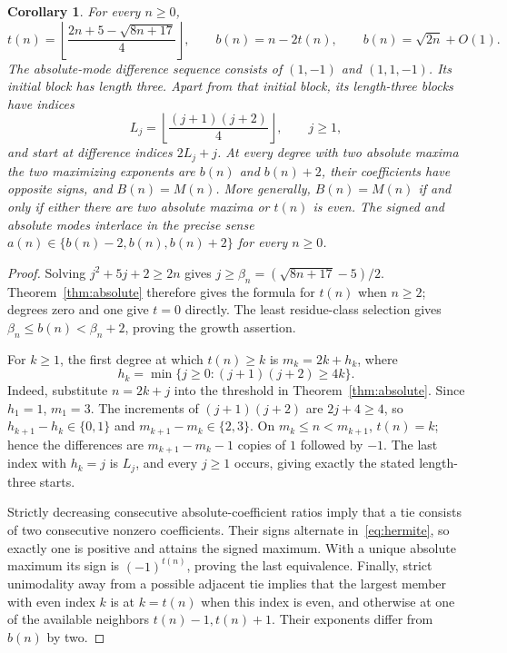 \documentclass[11pt]{article}
\newtheorem{corollary}[theorem]{Corollary}
\newcommand{\floor}[1]{\left\lfloor #1\right\rfloor}
\begin{document}
\begin{corollary}\label{cor:absolute-blocks}
For every $n\geq0$,
\[
 t(n)=\floor{\frac{2n+5-\sqrt{8n+17}}4},\qquad b(n)=n-2t(n),
 \qquad b(n)=\sqrt{2n}+O(1).
\]
The absolute-mode difference sequence consists of $(1,-1)$ and $(1,1,-1)$.
Its initial block has length three. Apart from that initial block, its
length-three blocks have indices
\[
 L_j=\floor{\frac{(j+1)(j+2)}4},\qquad j\geq1,
\]
and start at difference indices $2L_j+j$.
At every degree with two absolute maxima the two maximizing exponents
are $b(n)$ and $b(n)+2$, their coefficients have opposite signs,
and $B(n)=M(n)$.
More generally, $B(n)=M(n)$ if and only if either there are two absolute
maxima or $t(n)$ is even.
The signed and absolute modes interlace in the precise sense
$a(n)\in\{b(n)-2,b(n),b(n)+2\}$ for every $n\geq0$.
\end{corollary}

\begin{proof}
Solving $j^2+5j+2\geq2n$ gives
$j\geq\beta_n=(\sqrt{8n+17}-5)/2$. Theorem~\ref{thm:absolute}
therefore gives the formula for $t(n)$ when $n\geq2$; degrees zero and
one give $t=0$ directly. The least residue-class selection gives
$\beta_n\leq b(n)<\beta_n+2$, proving the growth assertion.

For $k\geq1$, the first degree at which $t(n)\geq k$ is
$m_k=2k+h_k$, where
\[
 h_k=\min\{j\geq0:(j+1)(j+2)\geq4k\}.
\]
Indeed, substitute $n=2k+j$ into the threshold in
Theorem~\ref{thm:absolute}. Since $h_1=1$, $m_1=3$.
The increments of $(j+1)(j+2)$ are $2j+4\geq4$, so
$h_{k+1}-h_k\in\{0,1\}$ and $m_{k+1}-m_k\in\{2,3\}$.
On $m_k\leq n<m_{k+1}$, $t(n)=k$; hence the differences are
$m_{k+1}-m_k-1$ copies of $1$ followed by $-1$.
The last index with $h_k=j$ is $L_j$, and every $j\geq1$ occurs,
giving exactly the stated length-three starts.

Strictly decreasing consecutive absolute-coefficient ratios imply that
a tie consists of two consecutive nonzero coefficients. Their signs
alternate in~\eqref{eq:hermite}, so exactly one is positive and attains
the signed maximum. With a unique absolute maximum its sign is
$(-1)^{t(n)}$, proving the last equivalence.
Finally, strict unimodality away from a possible adjacent tie implies
that the largest member with even index $k$ is at $k=t(n)$ when this
index is even, and otherwise at one of the available neighbors
$t(n)-1,t(n)+1$. Their exponents differ from $b(n)$ by two.
\end{proof}
\end{document}
